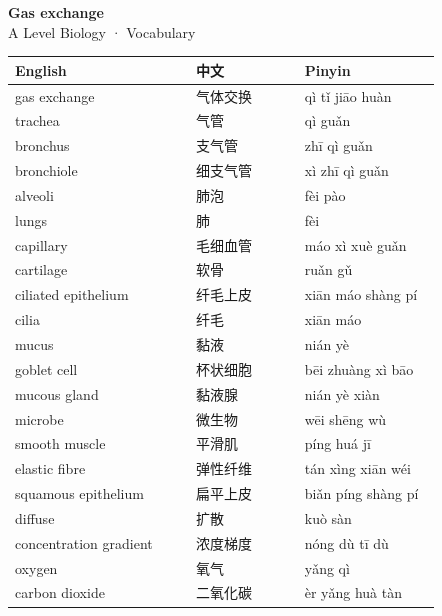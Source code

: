 \documentclass[11pt]{article}
\begin{document}
\begin{center}
  {\LARGE\bfseries Gas exchange}\\[0.35em]
  {\large A Level Biology · Vocabulary}
\end{center}
\vspace{0.6em}

\begin{longtable}{@{}p{0.40\linewidth}p{0.24\linewidth}p{0.30\linewidth}@{}}
\toprule
\textbf{English} & \textbf{中文} & \textbf{Pinyin} \\
\midrule
\endhead
\bottomrule
\endlastfoot
gas exchange & 气体交换 & qì tǐ jiāo huàn \\
trachea & 气管 & qì guǎn \\
bronchus & 支气管 & zhī qì guǎn \\
bronchiole & 细支气管 & xì zhī qì guǎn \\
alveoli & 肺泡 & fèi pào \\
lungs & 肺 & fèi \\
capillary & 毛细血管 & máo xì xuè guǎn \\
cartilage & 软骨 & ruǎn gǔ \\
ciliated epithelium & 纤毛上皮 & xiān máo shàng pí \\
cilia & 纤毛 & xiān máo \\
mucus & 黏液 & nián yè \\
goblet cell & 杯状细胞 & bēi zhuàng xì bāo \\
mucous gland & 黏液腺 & nián yè xiàn \\
microbe & 微生物 & wēi shēng wù \\
smooth muscle & 平滑肌 & píng huá jī \\
elastic fibre & 弹性纤维 & tán xìng xiān wéi \\
squamous epithelium & 扁平上皮 & biǎn píng shàng pí \\
diffuse & 扩散 & kuò sàn \\
concentration gradient & 浓度梯度 & nóng dù tī dù \\
oxygen & 氧气 & yǎng qì \\
carbon dioxide & 二氧化碳 & èr yǎng huà tàn \\
\end{longtable}
\end{document}
